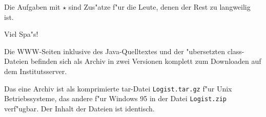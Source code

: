 \documentclass{article}
\begin{document}
\vspace{1em}

Die Aufgaben mit $\star$ sind Zus"atze f"ur die Leute, denen der Rest
zu langweilig ist. 

\vspace{1em}

Viel Spa"s!

\vspace{3em}

Die WWW-Seiten inklusive des Java-Quelltextes und der "ubersetzten
class-Dateien befinden sich als Archiv in zwei Versionen komplett zum
Downloaden auf dem Institutsserver.

Das eine Archiv ist als komprimierte tar-Datei \texttt{Logist.tar.gz} f"ur
Unix Betriebssysteme, das andere f"ur Windows 95
in der Datei \texttt{Logist.zip} verf"ugbar. Der Inhalt der Dateien ist
identisch.
\end{document}
